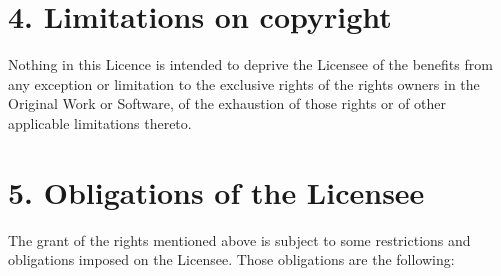 \documentclass[letterpaper,10pt,english]{sphinxmanual}
\begin{document}
\section{4. Limitations on copyright}
\label{license:limitations-on-copyright}
Nothing in this Licence is intended to deprive the Licensee of the benefits from any
exception or limitation to the exclusive rights of the rights owners in the Original
Work or Software, of the exhaustion of those rights or of other applicable limitations
thereto.


\section{5. Obligations of the Licensee}
\label{license:obligations-of-the-licensee}
The grant of the rights mentioned above is subject to some restrictions and obligations
imposed on the Licensee. Those obligations are the following:
\end{document}
